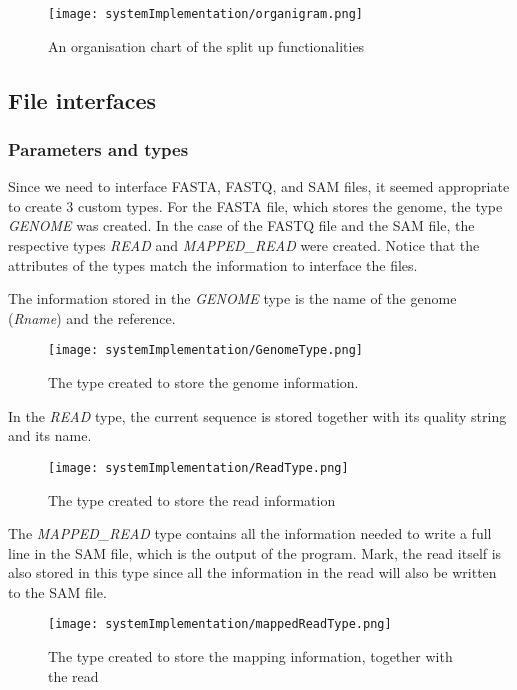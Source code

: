 \begin{figure}[H]
	\centering
	\texttt{[image: systemImplementation/organigram.png]}
	\caption{An organisation chart of the split up functionalities}
	\label{fig:organigram}
\end{figure}

\subsection{File interfaces}

\subsubsection{Parameters and types}

Since we need to interface FASTA, FASTQ, and SAM files, it seemed appropriate to create 3 custom types. For the FASTA file, which stores the genome, the type \emph{GENOME} was created. In the case of the FASTQ file and the SAM file, the respective types \emph{READ} and \emph{MAPPED\_READ} were created. Notice that the attributes of the types match the information to interface the files.

The information stored in the \emph{GENOME} type is the name of the genome (\emph{Rname}) and the reference.

\begin{figure}[H]
	\centering
	\texttt{[image: systemImplementation/GenomeType.png]}
	\caption{The type created to store the genome information.}
	\label{fig:GenomeType}
\end{figure}

In the \emph{READ} type, the current sequence is stored together with its quality string and its name.

\begin{figure}[H]
	\centering
	\texttt{[image: systemImplementation/ReadType.png]}
	\caption{The type created to store the read information}
	\label{fig:ReadType}
\end{figure}

The \emph{MAPPED\_READ} type contains all the information needed to write a full line in the SAM file, which is the output of the program.
Mark, the read itself is also stored in this type since all the information in the read will also be written to the SAM file.

\begin{figure}[H]
	\centering
	\texttt{[image: systemImplementation/mappedReadType.png]}
	\caption{The type created to store the mapping information, together with the read}
	\label{fig:mappedReadType}
\end{figure}

